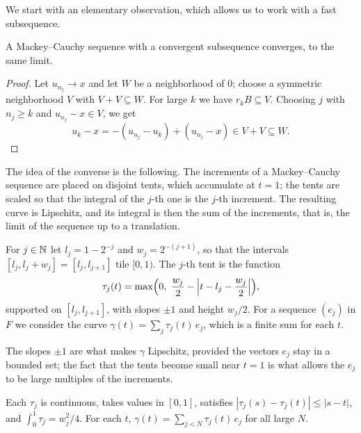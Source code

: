 We start with an elementary observation, which allows us to work with a fast subsequence.

\begin{lemma}[Subsequences]
  \label{lem:mackey-subseq}
  \leanok
  A Mackey--Cauchy sequence with a convergent subsequence converges, to the same limit.
\end{lemma}

\begin{proof}
  \leanok
  Let $u_{n_j} \to x$ and let $W$ be a neighborhood of $0$; choose a symmetric neighborhood $V$
  with $V + V \subseteq W$. For large $k$ we have $r_k B \subseteq V$. Choosing $j$ with
  $n_j \geq k$ and $u_{n_j} - x \in V$, we get
  \[
    u_k - x = -(u_{n_j} - u_k) + (u_{n_j} - x) \in V + V \subseteq W .
  \]
\end{proof}

The idea of the converse is the following. The increments of a Mackey--Cauchy sequence are
placed on disjoint tents, which accumulate at $t = 1$; the tents are scaled so that the
integral of the $j$-th one is the $j$-th increment. The resulting curve is Lipschitz, and its
integral is then the sum of the increments, that is, the limit of the sequence up to a
translation.

\begin{definition}[Tents]
  \label{def:tents}
  \leanok
  For $j \in \mathbb{N}$ let $l_j = 1 - 2^{-j}$ and $w_j = 2^{-(j+1)}$, so that the intervals
  $[l_j, l_j + w_j] = [l_j, l_{j+1}]$ tile $[0, 1)$. The $j$-th tent is the function
  \[
    \tau_j(t) = \max\Bigl(0,\ \frac{w_j}{2} - \Bigl|t - l_j - \frac{w_j}{2}\Bigr|\Bigr),
  \]
  supported on $[l_j, l_{j+1}]$, with slopes $\pm 1$ and height $w_j / 2$. For a sequence
  $(e_j)$ in $F$ we consider the curve $\gamma(t) = \sum_j \tau_j(t)\, e_j$, which is a finite
  sum for each $t$.
\end{definition}

The slopes $\pm 1$ are what makes $\gamma$ Lipschitz, provided the vectors $e_j$ stay in a
bounded set; the fact that the tents become small near $t = 1$ is what allows the $e_j$ to be
large multiples of the increments.

\begin{lemma}
  \label{lem:tents}
  \leanok
  Each $\tau_j$ is continuous, takes values in $[0, 1]$, satisfies
  $|\tau_j(s) - \tau_j(t)| \leq |s - t|$, and $\int_0^1 \tau_j = w_j^2 / 4$. For each $t$,
  $\gamma(t) = \sum_{j < N} \tau_j(t)\, e_j$ for all large $N$.
\end{lemma}

